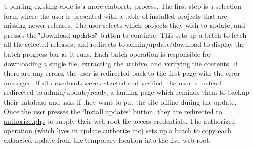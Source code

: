 Updating existing code is a more elaborate process. The first step is a selection form where the user is presented with a table of installed projects that are missing newer releases. The user selects which projects they wish to update, and presses the \char`\"{}Download updates\char`\"{} button to continue. This sets up a batch to fetch all the selected releases, and redirects to admin/update/download to display the batch progress bar as it runs. Each batch operation is responsible for downloading a single file, extracting the archive, and verifying the contents. If there are any errors, the user is redirected back to the first page with the error messages. If all downloads were extacted and verified, the user is instead redirected to admin/update/ready, a landing page which reminds them to backup their database and asks if they want to put the site offline during the update. Once the user presses the \char`\"{}Install updates\char`\"{} button, they are redirected to \hyperlink{authorize_8php}{authorize.php} to supply their web root file access credentials. The authorized operation (which lives in \hyperlink{update_8authorize_8inc}{update.authorize.inc}) sets up a batch to copy each extracted update from the temporary location into the live web root. 